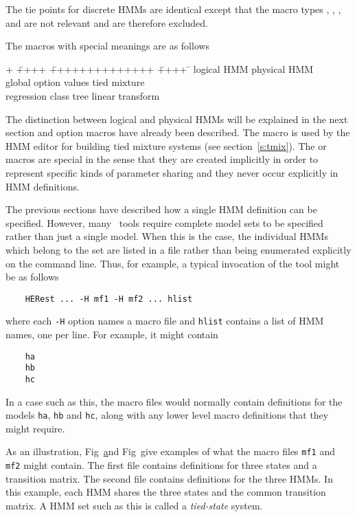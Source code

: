 
\noindent
The tie points for discrete HMMs are identical except that the
macro types , , ,  and  are not
relevant and are therefore excluded.

The macros with special meanings are as follows
\begin{tabbing}
+ \= ++++ \= ++++++++++++++ \= ++++ \=\kill
\>  \>  logical HMM \>  \>  physical HMM \\
\>  \>  global option values \>  \>  tied mixture \\
\>  \>  regression class tree \>  \> linear transform
\end{tabbing}
The distinction between logical and physical HMMs will be explained
in the next section and option macros have already been described.
The  macro is used by the HMM editor 
for building tied mixture systems (see section~\ref{s:tmix}).
The  or  macros are special in the sense
that they are created implicitly in order to represent specific kinds 
of parameter sharing and they never occur explicitly in HMM definitions.


The previous sections have described how a single HMM definition
can be specified.  However, many \HTK\ tools require complete model
sets to be specified rather than just a single model.
When this is the case, the individual HMMs which belong to the set
are listed in a file rather than being enumerated explicitly on
the command line.  Thus, for example, a typical invocation of
the tool  might be as follows
\begin{verbatim}
    HERest ... -H mf1 -H mf2 ... hlist
\end{verbatim}
where each \texttt{-H} option names a macro file and \texttt{hlist}
contains a list of HMM names, one per line. For example, it might contain
\begin{verbatim}
    ha
    hb
    hc
\end{verbatim}
In a case such as this, the macro files would normally
contain definitions for the models \texttt{ha}, 
\texttt{hb} and \texttt{hc}, along with any lower level macro 
definitions that they might require.

As an illustration,
Fig~\href{f:mac6def} and Fig~\href{f:hmm6def} give examples of
what the macro files \texttt{mf1} and \texttt{mf2} might contain.
The first file contains definitions for three states and a
transition matrix.  The second file
contains definitions for the three HMMs.  In this example,
each HMM shares the three
states and the common transition matrix.  A HMM set such as 
this is called a \textit{tied-state} system.


